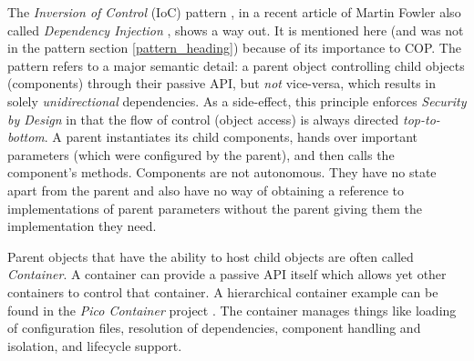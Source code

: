 The \emph{Inversion of Control} (IoC) pattern \cite{avalon}, in a recent
article of Martin Fowler also called \emph{Dependency Injection}
\cite{fowlerioc}, shows a way out. It is mentioned here (and was not in the
pattern section \ref{pattern_heading}) because of its importance to COP. The
pattern refers to a major semantic detail: a parent object controlling child
objects (components) through their passive API, but \emph{not} vice-versa,
which results in solely \emph{unidirectional} dependencies. As a side-effect,
this principle enforces \emph{Security by Design} in that the flow of control
(object access) is always directed \emph{top-to-bottom}. A parent instantiates
its child components, hands over important parameters (which were configured by
the parent), and then calls the component's methods. Components are not
autonomous. They have no state apart from the parent and also have no way of
obtaining a reference to implementations of parent parameters without the
parent giving them the implementation they need.

Parent objects that have the ability to host child objects are often called
\emph{Container}. A container can provide a passive API itself which allows yet
other containers to control that container. A hierarchical container example
can be found in the \emph{Pico Container} project \cite{picocontainer}. The
container manages things like loading of configuration files, resolution of
dependencies, component handling and isolation, and lifecycle support.

